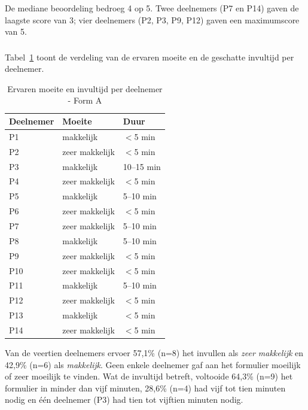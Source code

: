De mediane beoordeling bedroeg 4 op 5. Twee deelnemers (P7 en P14) gaven de laagste score van 3; vier deelnemers (P2, P3, P9, P12) gaven een maximumscore van 5.

\subsubsection{}

Tabel~\ref{tab:vroeg-moeite-duur} toont de verdeling van de ervaren moeite en de geschatte invultijd per deelnemer.

\begin{table}[h]
  \centering
  \caption[Ervaren moeite en invultijd vroege test Form A]{Ervaren moeite en invultijd per deelnemer - Form A}
  \label{tab:vroeg-moeite-duur}
  \begin{tabular}{lll}
    \hline
    \textbf{Deelnemer} & \textbf{Moeite} & \textbf{Duur} \\
    \hline
    P1  & makkelijk       & $<$5 min    \\
    P2  & zeer makkelijk  & $<$5 min    \\
    P3  & makkelijk       & 10–15 min   \\
    P4  & zeer makkelijk  & $<$5 min    \\
    P5  & makkelijk       & 5–10 min    \\
    P6  & zeer makkelijk  & $<$5 min    \\
    P7  & zeer makkelijk  & 5–10 min    \\
    P8  & makkelijk       & 5–10 min    \\
    P9  & zeer makkelijk  & $<$5 min    \\
    P10 & zeer makkelijk  & $<$5 min    \\
    P11 & makkelijk       & 5–10 min    \\
    P12 & zeer makkelijk  & $<$5 min    \\
    P13 & makkelijk       & $<$5 min    \\
    P14 & zeer makkelijk  & $<$5 min    \\
    \hline
  \end{tabular}
\end{table}

Van de veertien deelnemers ervoer 57,1\% (n=8) het invullen als \textit{zeer makkelijk} en 42,9\% (n=6) als \textit{makkelijk}. Geen enkele deelnemer gaf aan het formulier moeilijk of zeer moeilijk te vinden. Wat de invultijd betreft, voltooide 64,3\% (n=9) het formulier in minder dan vijf minuten, 28,6\% (n=4) had vijf tot tien minuten nodig en één deelnemer (P3) had tien tot vijftien minuten nodig.

